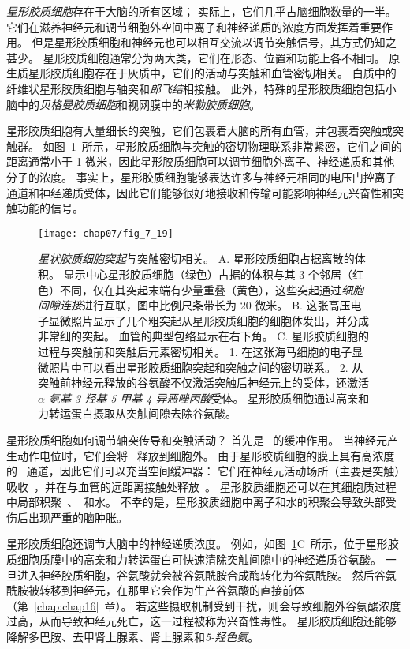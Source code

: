 \textit{星形胶质细胞}存在于大脑的所有区域；
实际上，它们几乎占脑细胞数量的一半。
它们在滋养神经元和调节细胞外空间中离子和神经递质的浓度方面发挥着重要作用。
但是星形胶质细胞和神经元也可以相互交流以调节突触信号，其方式仍知之甚少。
星形胶质细胞通常分为两大类，它们在形态、位置和功能上各不相同。
原生质星形胶质细胞存在于灰质中，它们的活动与突触和血管密切相关。
白质中的纤维状星形胶质细胞与轴突和\textit{郎飞结}相接触。
此外，特殊的星形胶质细胞包括小脑中的\textit{贝格曼胶质细胞}和视网膜中的\textit{米勒胶质细胞}。


星形胶质细胞有大量细长的突触，它们包裹着大脑的所有血管，并包裹着突触或突触群。
如图~\ref{fig:7_19}~所示，星形胶质细胞与突触的密切物理联系非常紧密，它们之间的距离通常小于 1 微米，因此星形胶质细胞可以调节细胞外离子、神经递质和其他分子的浓度。
事实上，星形胶质细胞能够表达许多与神经元相同的电压门控离子通道和神经递质受体，因此它们能够很好地接收和传输可能影响神经元兴奋性和突触功能的信号。


\begin{figure}[htbp]
	\centering
	\texttt{[image: chap07/fig\_7\_19]}
	\caption{\textit{星状胶质细胞突起}与突触密切相关。
		A. 星形胶质细胞占据离散的体积。
		显示中心星形胶质细胞（绿色）占据的体积与其 3 个邻居（红色）不同，仅在其突起末端有少量重叠（黄色），这些突起通过\textit{细胞间隙连接}进行互联，图中比例尺条带长为 20 微米\cite{bushong2002protoplasmic}。
		B. 这张高压电子显微照片显示了几个粗突起从星形胶质细胞的细胞体发出，并分成非常细的突起。
		血管的典型包络显示在右下角\cite{hama1994three}。
		C. 星形胶质细胞的过程与突触前和突触后元素密切相关。
		1. 在这张海马细胞的电子显微照片中可以看出星形胶质细胞突起和突触之间的密切联系\cite{ventura1999three}。
		2. 从突触前神经元释放的谷氨酸不仅激活突触后神经元上的受体，还激活\textit{$\alpha$-氨基-3-羟基-5-甲基-4-异恶唑丙酸}受体。
		星形胶质细胞通过高亲和力转运蛋白摄取从突触间隙去除谷氨酸\cite{gallo2001unwrapping}。}
	\label{fig:7_19}
\end{figure}


星形胶质细胞如何调节轴突传导和突触活动？
首先是~ 的缓冲作用。
当神经元产生动作电位时，它们会将~ 释放到细胞外。
由于星形胶质细胞的膜上具有高浓度的~ 通道，因此它们可以充当空间缓冲器：
它们在神经元活动场所（主要是突触）吸收~，并在与血管的远距离接触处释放~。
星形胶质细胞还可以在其细胞质过程中局部积聚~、~和水。
不幸的是，星形胶质细胞中离子和水的积聚会导致头部受伤后出现严重的脑肿胀。


星形胶质细胞还调节大脑中的神经递质浓度。
例如，如图~\ref{fig:7_19}C~所示，位于星形胶质细胞质膜中的高亲和力转运蛋白可快速清除突触间隙中的神经递质谷氨酸。
一旦进入神经胶质细胞，谷氨酸就会被谷氨酰胺合成酶转化为谷氨酰胺。
然后谷氨酰胺被转移到神经元，在那里它会作为生产谷氨酸的直接前体（第~\ref{chap:chap16}~章）。
若这些摄取机制受到干扰，则会导致细胞外谷氨酸浓度过高，从而导致神经元死亡，这一过程被称为兴奋性毒性。
星形胶质细胞还能够降解多巴胺、去甲肾上腺素、肾上腺素和\textit{5-羟色氨}。


